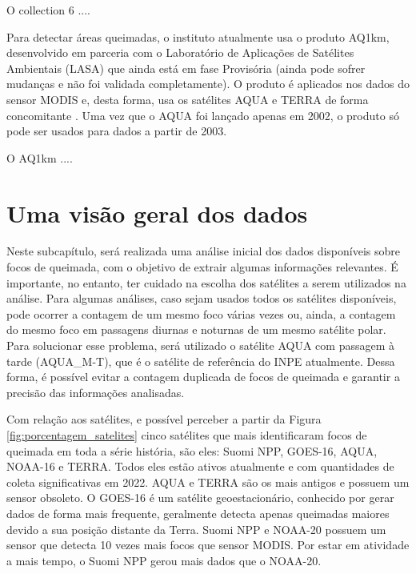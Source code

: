 \documentclass[cic,tc]{iiufrgs}
\begin{document}
O collection 6 .... \citep{GIGLIO2016} \par

Para detectar áreas queimadas, o instituto atualmente usa o produto AQ1km, desenvolvido em parceria com o Laboratório de Aplicações de Satélites Ambientais (LASA) \citep{SiteAQ1km} que ainda está em fase Provisória (ainda pode sofrer mudanças e não foi validada completamente). O produto é aplicados nos dados do sensor MODIS e, desta forma, usa os satélites AQUA e TERRA de forma concomitante \citep{libonati2015algorithm}. Uma vez que o AQUA foi lançado apenas em 2002, o produto só pode ser usados para dados a partir de 2003. \par

O AQ1km .... \citep{libonati2015algorithm} \par

\section{Uma visão geral dos dados}

Neste subcapítulo, será realizada uma análise inicial dos dados disponíveis sobre focos de queimada, com o objetivo de extrair algumas informações relevantes. É importante, no entanto, ter cuidado na escolha dos satélites a serem utilizados na análise. Para algumas análises, caso sejam usados todos os satélites disponíveis, pode ocorrer a contagem de um mesmo foco várias vezes ou, ainda, a contagem do mesmo foco em passagens diurnas e noturnas de um mesmo satélite polar. Para solucionar esse problema, será utilizado o satélite AQUA com passagem à tarde (AQUA\_M-T), que é  o satélite de referência do INPE atualmente. Dessa forma, é possível evitar a contagem duplicada de focos de queimada e garantir a precisão das informações analisadas. \par

Com relação aos satélites, e possível perceber a partir da Figura \ref{fig:porcentagem_satelites} cinco satélites que mais identificaram focos de queimada em toda a série história, são eles: Suomi NPP, GOES-16, AQUA, NOAA-16 e TERRA. Todos eles estão ativos atualmente e com quantidades de coleta significativas em 2022. AQUA e TERRA são os mais antigos e possuem um sensor obsoleto. O GOES-16 é um satélite geoestacionário, conhecido por gerar dados de forma mais frequente, geralmente detecta apenas queimadas maiores devido a sua posição distante da Terra. Suomi NPP e NOAA-20 possuem um sensor que detecta 10 vezes mais focos que sensor MODIS. Por estar em atividade a mais tempo, o Suomi NPP gerou mais dados que o NOAA-20. \par
\end{document}
